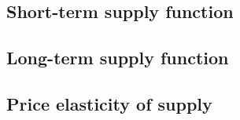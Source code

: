 

\subsection{Short-term supply function}

\subsection{Long-term supply function}

\subsection{Price elasticity of supply}

